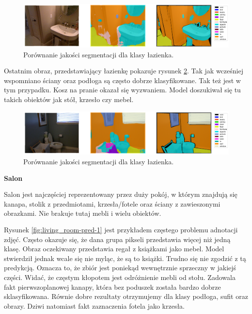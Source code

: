 \begin{figure}[ht!]
    \centering
    \includegraphics[width=\textwidth]{img/preds_analysis/gt_vs_pred/bathroom-2.png}
    \caption{Porównanie jakości segmentacji dla klasy łazienka.}
    \label{fig:bathroom-pred-2}
\end{figure}

Ostatnim obraz, przedstawiający łazienkę pokazuje rysunek \ref{fig:bathroom-pred-3}. Tak jak wcześniej wspomniano ściany oraz podłoga są często dobrze klasyfikowane. Tak też jest w tym przypadku. Kosz na pranie okazał się wyzwaniem. Model doszukiwał się tu takich obiektów jak stół, krzesło czy mebel.

\begin{figure}[ht!]
    \centering
    \includegraphics[width=\textwidth]{img/preds_analysis/gt_vs_pred/bathroom-3.png}
    \caption{Porównanie jakości segmentacji dla klasy łazienka.}
    \label{fig:bathroom-pred-3}
\end{figure}

\noindent
\textbf{Salon}

Salon jest najczęściej reprezentowany przez duży pokój, w którym znajdują się kanapa, stolik z przedmiotami, krzesła/fotele oraz ściany z zawieszonymi obrazkami. Nie brakuje tutaj mebli i wielu obiektów.

Rysunek \ref{fig:living_room-pred-1} jest przykładem częstego problemu adnotacji zdjęć. Często okazuje się, że dana grupa pikseli przedstawia więcej niż jedną klasę. Obraz oczekiwany przedstawia regał z książkami jako mebel. Model stwierdził jednak wcale się nie myląc, że są to książki. Trudno się nie zgodzić z tą predykcją. Oznacza to, że zbiór jest poniekąd wewnętrznie sprzeczny w jakiejś części. Widać, że częstym kłopotem jest odróżnienie mebli od stołu. Zadowala fakt pierwszoplanowej kanapy, która bez poduszek została bardzo dobrze sklasyfikowana. Równie dobre rezultaty otrzymujemy dla klasy podłoga, sufit oraz obrazy. Dziwi natomiast fakt zaznaczenia fotela jako krzesła.

